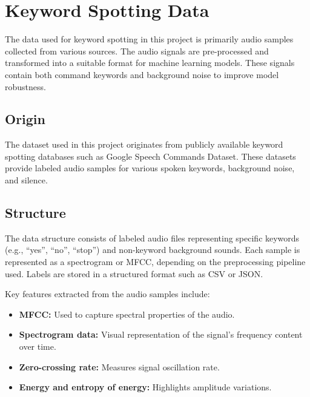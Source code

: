 %
%

\chapter{Keyword Spotting Data}

The data used for keyword spotting in this project is primarily audio samples collected from various sources. The audio signals are pre-processed and transformed into a suitable format for machine learning models. These signals contain both command keywords and background noise to improve model robustness.

\section{Origin}

The dataset used in this project originates from publicly available keyword spotting databases such as Google Speech Commands Dataset. These datasets provide labeled audio samples for various spoken keywords, background noise, and silence.



\section{Structure}

The data structure consists of labeled audio files representing specific keywords (e.g., ``yes'', ``no'', ``stop'') and non-keyword background sounds. Each sample is represented as a spectrogram or \ac{MFCC}, depending on the preprocessing pipeline used. Labels are stored in a structured format such as CSV or JSON.

\medskip

Key features extracted from the audio samples include:

\begin{itemize}
	\item \textbf{\ac{MFCC}:} Used to capture spectral properties of the audio.
	\item \textbf{Spectrogram data:} Visual representation of the signal's frequency content over time.
	\item \textbf{Zero-crossing rate:} Measures signal oscillation rate.
	\item \textbf{Energy and entropy of energy:} Highlights amplitude variations.
\end{itemize}

